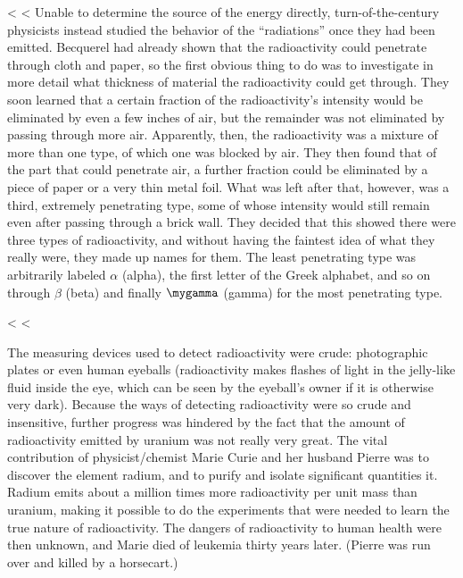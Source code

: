     <%
    <%
        Unable to determine the source of the energy directly,
        turn-of-the-century physicists instead studied the behavior of the
        ``radiations'' once they had been emitted.
         Becquerel had already shown that the
        radioactivity could penetrate through cloth and paper, so
        the first obvious thing to do was to investigate in more
        detail what thickness of material the radioactivity could
        get through. They soon learned that a certain fraction of
        the radioactivity's intensity would be eliminated by even a
        few inches of air, but the remainder was not eliminated by
        passing through more air. Apparently, then, the radioactivity
        was a mixture of more than one type, of which one was
        blocked by air. They then found that of the part that could
        penetrate air, a further fraction could be eliminated by a
        piece of paper or a very thin metal foil. What was left
        after that, however, was a third, extremely penetrating
        type, some of whose intensity would still remain even after
        passing through a brick wall. They decided that this showed
        there were three types of radioactivity, and without having
        the faintest idea of what they really were, they made up
        names for them. The least penetrating type was arbitrarily
        labeled $\alpha$ (alpha), the first letter of the Greek alphabet,
        and so on through $\beta$ (beta) and finally $\mygamma$
        (gamma) for the most penetrating type.

    <%
    <%

        The measuring devices used to detect radioactivity were
        crude: photographic plates or even human eyeballs (radioactivity
        makes flashes of light in the jelly-like fluid inside
        the eye, which can be seen by the eyeball's owner if it is
        otherwise very dark). Because the ways of detecting
        radioactivity were so crude and insensitive, further
        progress was hindered by the fact that the amount of
        radioactivity emitted by uranium was not really very great.
        The vital contribution of physicist/chemist Marie Curie and
        her husband Pierre was to discover the element radium, and
        to purify and isolate significant quantities it. Radium
        emits about a million times more radioactivity per unit mass
        than uranium, making it possible to do the experiments that
        were needed to learn the true nature of radioactivity. The
        dangers of radioactivity to human health were then unknown,
        and Marie died of leukemia thirty years later. (Pierre was
        run over and killed by a horsecart.)

